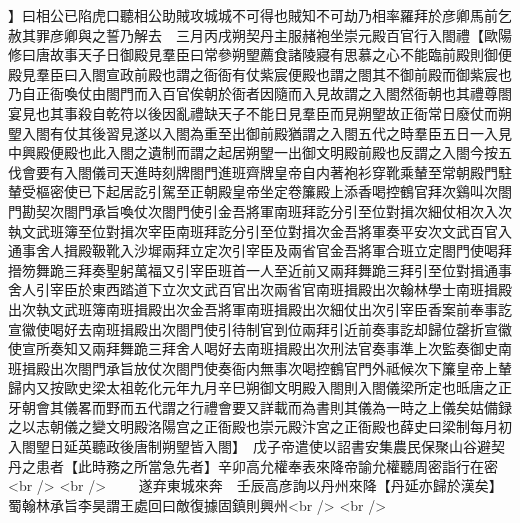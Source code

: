 】曰相公已陷虎口聽相公助賊攻城城不可得也賊知不可劫乃相率羅拜於彦卿馬前乞赦其罪彦卿與之誓乃解去　三月丙戌朔契丹主服赭袍坐崇元殿百官行入閤禮【歐陽修曰唐故事天子日御殿見羣臣曰常參朔朢薦食諸陵寢有思慕之心不能臨前殿則御便殿見羣臣曰入閤宣政前殿也謂之衙衙有仗紫宸便殿也謂之閤其不御前殿而御紫宸也乃自正衙喚仗由閤門而入百官俟朝於衙者因隨而入見故謂之入閤然衙朝也其禮尊閤宴見也其事殺自乾符以後因亂禮缺天子不能日見羣臣而見朔朢故正衙常日廢仗而朔朢入閤有仗其後習見遂以入閤為重至出御前殿猶謂之入閤五代之時羣臣五日一入見中興殿便殿也此入閤之遺制而謂之起居朔朢一出御文明殿前殿也反謂之入閤今按五伐會要有入閤儀司天進時刻牌閤門進班齊牌皇帝自内著袍衫穿靴乘輦至常朝殿門駐輦受樞密使已下起居訖引駕至正朝殿皇帝坐定卷簾殿上添香喝控鶴官拜次鷄叫次閤門勘契次閤門承旨喚仗次閤門使引金吾將軍南班拜訖分引至位對揖次細仗相次入次執文武班簿至位對揖次宰臣南班拜訖分引至位對揖次金吾將軍奏平安次文武百官入通事舍人揖殿靸靴入沙墀兩拜立定次引宰臣及兩省官金吾將軍合班立定閤門使喝拜搢笏舞跪三拜奏聖躬萬福又引宰臣班首一人至近前又兩拜舞跪三拜引至位對揖通事舍人引宰臣於東西踏道下立次文武百官出次兩省官南班揖殿出次翰林學士南班揖殿出次執文武班簿南班揖殿出次金吾將軍南班揖殿出次細仗出次引宰臣香案前奉事訖宣徽使喝好去南班揖殿出次閤門使引待制官到位兩拜引近前奏事訖却歸位罄折宣徽使宣所奏知又兩拜舞跪三拜舍人喝好去南班揖殿出次刑法官奏事準上次監奏御史南班揖殿出次閤門承旨放仗次閤門使奏衙内無事次喝控鶴官門外祗候次下簾皇帝上輦歸内又按歐史梁太祖乾化元年九月辛巳朔御文明殿入閤則入閤儀梁所定也㫝唐之正牙朝會其儀畧而野而五代謂之行禮會要又詳載而為書則其儀為一時之上儀矣姑備録之以志朝儀之變文明殿洛陽宫之正衙殿也崇元殿汴宮之正衙殿也薛史曰梁制每月初入閤朢日延英聽政後唐制朔朢皆入閤】　戊子帝遣使以詔書安集農民保聚山谷避契丹之患者【此時務之所當急先者】辛卯高允權奉表來降帝諭允權聽周密詣行在密<br />
<br />
　　遂弃東城來奔　壬辰高彦詢以丹州來降【丹延亦歸於漢矣】蜀翰林承旨李昊謂王處回曰敵復據固鎮則興州<br />
<br />
